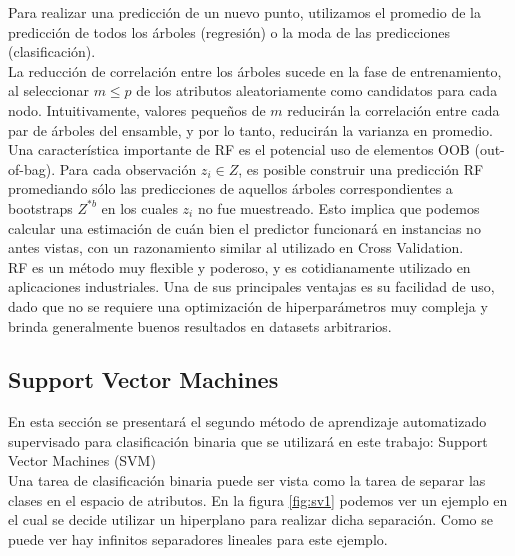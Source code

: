 Para realizar una predicción de un nuevo punto, utilizamos el promedio de la predicción de todos los árboles (regresión) o la moda de las predicciones (clasificación). \\

La reducción de correlación entre los árboles sucede en la fase de entrenamiento, al seleccionar $m \leq p$ de los atributos aleatoriamente como candidatos para cada nodo. Intuitivamente, valores pequeños de $m$ reducirán la correlación entre cada par de árboles del ensamble, y por lo tanto, reducirán la varianza en promedio. \\

Una característica importante de RF es el potencial uso de elementos OOB (out-of-bag). Para cada observación $z_i \in Z$, es posible construir una predicción RF promediando sólo las predicciones de aquellos árboles correspondientes a bootstraps $Z^{*b}$ en los cuales $z_i$ no fue muestreado. Esto implica que podemos calcular una estimación de cuán bien el predictor funcionará en instancias no antes vistas, con un razonamiento similar al utilizado en Cross Validation. \\

RF es un método muy flexible y poderoso, y es cotidianamente utilizado en aplicaciones industriales. Una de sus principales ventajas es su facilidad de uso, dado que no se requiere una optimización de hiperparámetros muy compleja y brinda generalmente buenos resultados en datasets arbitrarios.

\subsection{Support Vector Machines}

\label{trick}

En esta sección se presentará el segundo método de aprendizaje automatizado supervisado para clasificación binaria que se utilizará en este trabajo: Support Vector Machines (SVM) \cite{svm2} \cite{svm}  \\

Una tarea de clasificación binaria puede ser vista como la tarea de separar las clases en el espacio de atributos. En la figura \ref{fig:sv1} podemos ver un ejemplo en el cual se decide utilizar un hiperplano para realizar dicha separación. Como se puede ver hay infinitos separadores lineales para este ejemplo. \\


